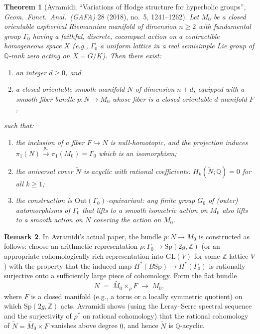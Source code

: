 \documentclass[12pt]{article}
\newtheorem{theorem}{Theorem}
\theoremstyle{definition}
\newtheorem{remark}[theorem]{Remark}
\begin{document}
\begin{theorem}[Avramidi; ``Variations of Hodge structure for hyperbolic groups'', \emph{Geom.\ Funct.\ Anal.\ (GAFA)} 28 (2018), no.~5, 1241--1262]\label{thm:Avramidi}
Let $M_0$ be a closed orientable aspherical Riemannian manifold of dimension $n\geq 2$ with fundamental group $\Gamma_0$ having a faithful, discrete, cocompact action on a contractible homogeneous space $X$ (e.g., $\Gamma_0$ a uniform lattice in a real semisimple Lie group of $\mathbb{Q}$-rank zero acting on $X=G/K$). Then there exist:
\begin{enumerate}[label=(\roman*)]
\item an integer $d\geq 0$, and
\item a closed orientable smooth manifold $N$ of dimension $n+d$, equipped with a smooth fiber bundle $p:N\to M_0$ whose fiber is a closed orientable $d$-manifold $F$,
\end{enumerate}
such that:
\begin{enumerate}[label=(\alph*)]
\item the inclusion of a fiber $F\hookrightarrow N$ is null-homotopic, and the projection induces $\pi_1(N)\xrightarrow{p_*}\pi_1(M_0)=\Gamma_0$ which is an isomorphism;
\item the universal cover $\widetilde{N}$ is acyclic with rational coefficients: $H_k(\widetilde{N};\mathbb{Q})=0$ for all $k\geq 1$;
\item the construction is $\mathrm{Out}(\Gamma_0)$-equivariant: any finite group $G_0$ of (outer) automorphisms of $\Gamma_0$ that lifts to a smooth isometric action on $M_0$ also lifts to a smooth action on $N$ covering the action on $M_0$.
\end{enumerate}
\end{theorem}

\begin{remark}
In Avramidi's actual paper, the bundle $p:N\to M_0$ is constructed as follows: choose an arithmetic representation $\rho:\Gamma_0\to\mathrm{Sp}(2g,\mathbb{Z})$ (or an appropriate cohomologically rich representation into $\mathrm{GL}(V)$ for some $\mathbb{Z}$-lattice $V$) with the property that the induced map $H^*(B\mathrm{Sp})\to H^*(\Gamma_0)$ is rationally surjective onto a sufficiently large piece of cohomology. Form the flat bundle
\[
N \;=\; \widetilde{M_0}\times_\rho F \;\to\; M_0,
\]
where $F$ is a closed manifold (e.g., a torus or a locally symmetric quotient) on which $\mathrm{Sp}(2g,\mathbb{Z})$ acts. Avramidi shows (using the Leray--Serre spectral sequence and the surjectivity of $\rho^*$ on rational cohomology) that the rational cohomology of $\widetilde{N}=\widetilde{M_0}\times F$ vanishes above degree $0$, and hence $\widetilde{N}$ is $\mathbb{Q}$-acyclic.
\end{remark}
\end{document}
